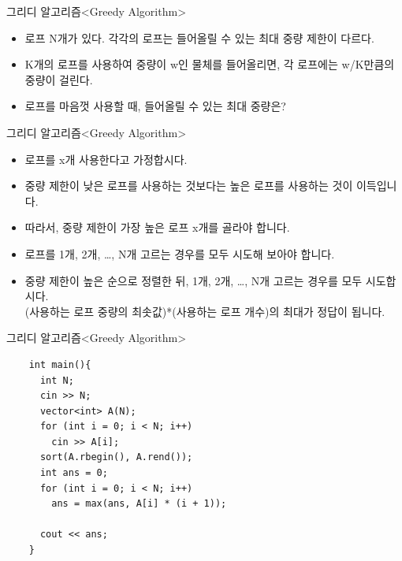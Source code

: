 \begin{frame}{그리디 알고리즘}{<Greedy Algorithm>}
  \begin{center}
  \end{center}
  \vspace{4mm}
  \begin{itemize}
    \item \alert{로프 N개}가 있다. 각각의 로프는 들어올릴 수 있는 최대 중량 제한이 다르다.
    \item K개의 로프를 사용하여 중량이 w인 물체를 들어올리면, 각 로프에는 \alert{w/K}만큼의 중량이 걸린다.
    \item 로프를 마음껏 사용할 때, 들어올릴 수 있는 \alert{최대 중량}은?
  \end{itemize}
\end{frame}

\begin{frame}{그리디 알고리즘}{<Greedy Algorithm>}
  \begin{center}
  \end{center}
  \vspace{4mm}
  \begin{itemize}
    \item 로프를 \alert{x개} 사용한다고 가정합시다.
    \item 중량 제한이 낮은 로프를 사용하는 것보다는 높은 로프를 사용하는 것이 이득입니다.
    \item 따라서, \alert{중량 제한이 가장 높은 로프} x개를 골라야 합니다.
    \item 로프를 1개, 2개, …, N개 고르는 경우를 모두 시도해 보아야 합니다.
    \item 중량 제한이 높은 순으로 정렬한 뒤, 1개, 2개, …, N개 고르는 경우를 모두 시도합시다. \\ \alert{(사용하는 로프 중량의 최솟값)*(사용하는 로프 개수)의 최대}가 정답이 됩니다.
  \end{itemize}
\end{frame}

\begin{frame}[fragile]{그리디 알고리즘}{<Greedy Algorithm>}
  \begin{verbatim}
    int main(){
      int N;
      cin >> N;
      vector<int> A(N);
      for (int i = 0; i < N; i++)
        cin >> A[i];
      sort(A.rbegin(), A.rend());
      int ans = 0;
      for (int i = 0; i < N; i++)
        ans = max(ans, A[i] * (i + 1));
      
      cout << ans;
    }
  \end{verbatim}
\end{frame}

